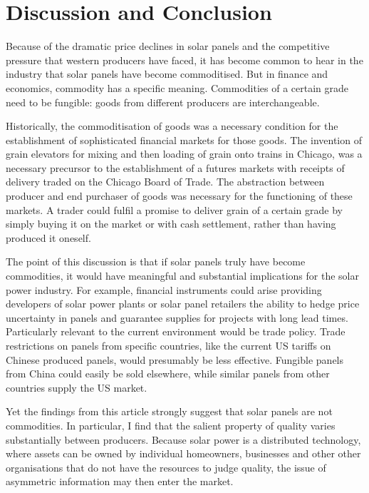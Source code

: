 \documentclass[12pt]{article}
\begin{document}
\section{Discussion and Conclusion}

Because of the dramatic price declines in solar panels and the competitive pressure that western producers have faced, it has become common to hear in the industry that solar panels have become commoditised. But in finance and economics, commodity has a specific meaning. Commodities of a certain grade need to be fungible: goods from different producers are interchangeable.

Historically, the commoditisation of goods was a necessary condition for the establishment of sophisticated financial markets for those goods. The invention of grain elevators for mixing and then loading of grain onto trains in Chicago, was a necessary precursor to the establishment of a futures markets with receipts of delivery traded on the Chicago Board of Trade.\citep{cronon_natures_1992} The abstraction between producer and end purchaser of goods was necessary for the functioning of these markets. A trader could fulfil a promise to deliver grain of a certain grade by simply buying it on the market or with cash settlement, rather than having produced it oneself.

 The point of this discussion is that if solar panels truly have become commodities, it would have meaningful and substantial implications for the solar power industry. For example, financial instruments could arise providing developers of solar power plants or solar panel retailers the ability to hedge price uncertainty in panels and guarantee supplies for projects with long lead times. Particularly relevant to the current environment would be trade policy. Trade restrictions on panels from specific countries, like the current US tariffs on Chinese produced panels, would presumably be less effective. Fungible panels from China could easily be sold elsewhere, while similar panels from other countries supply the US market.

 Yet the findings from this article strongly suggest that solar panels are not commodities. In particular, I find that the salient property of quality varies substantially between producers. Because solar power is a distributed technology, where assets can be owned by individual homeowners, businesses and other other organisations that do not have the resources to judge quality, the issue of asymmetric information may then enter the market.
\end{document}
